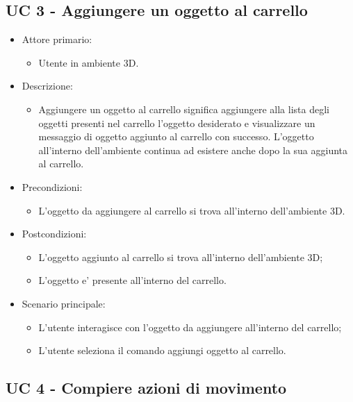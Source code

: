 \subsection{UC 3 - Aggiungere un oggetto al carrello}
\begin{itemize}

	\item Attore primario: 
	\begin{itemize}
		\item Utente in ambiente 3D.
	\end{itemize}
	\item Descrizione:
	\begin{itemize}
		\item Aggiungere un oggetto al carrello significa aggiungere alla lista degli oggetti presenti nel carrello l'oggetto desiderato e visualizzare un messaggio di oggetto aggiunto al carrello con successo.
\newline L'oggetto all'interno dell'ambiente continua ad esistere anche dopo la sua aggiunta al carrello.
	\end{itemize}
	
	\item Precondizioni:
	\begin{itemize}
		\item L'oggetto da aggiungere al carrello si trova all'interno dell'ambiente 3D.
	\end{itemize}
	
	\item Postcondizioni:
	\begin{itemize}
		\item L'oggetto aggiunto al carrello si trova all'interno dell'ambiente 3D;
		\item L'oggetto e' presente all'interno del carrello.
	\end{itemize}
	
	\item Scenario principale:
	\begin{itemize}
		\item L'utente interagisce con l'oggetto da aggiungere all'interno del carrello;
		\item L'utente seleziona il comando aggiungi oggetto al carrello.
	\end{itemize}
	
\end{itemize}

\pagebreak

\subsection{UC 4 - Compiere azioni di movimento}

